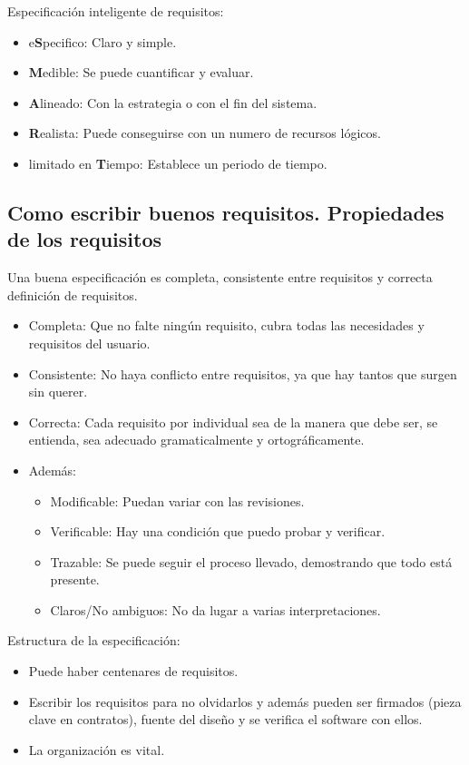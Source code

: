 \documentclass[12pt, twoside, openright]{report} %
\begin{document}
Especificación inteligente de requisitos:
\begin{itemize}
	\item e\textbf{S}pecifico: Claro y simple.
	\item \textbf{M}edible: Se puede cuantificar y evaluar.
	\item \textbf{A}lineado: Con la estrategia o con el fin del sistema.
	\item \textbf{R}ealista: Puede conseguirse con un numero de recursos lógicos.
	\item limitado en \textbf{T}iempo: Establece un periodo de tiempo.
\end{itemize}
\pagebreak
\subsection{Como escribir buenos requisitos. Propiedades de los requisitos}



Una buena especificación es completa, consistente entre requisitos y
correcta definición de requisitos.

\begin{itemize}
	\item Completa: Que no falte ningún requisito, cubra todas las
	      necesidades y requisitos del usuario.
	\item Consistente: No haya conflicto entre requisitos, ya que hay tantos
	      que surgen sin querer.
	\item Correcta: Cada requisito por individual sea de la manera que debe
	      ser, se entienda, sea adecuado gramaticalmente y ortográficamente.
	\item Además:

	      \begin{itemize}
		      \item Modificable: Puedan variar con las revisiones.
		      \item Verificable: Hay una condición que puedo probar y verificar.
		      \item Trazable: Se puede seguir el proceso llevado, demostrando que
		            todo está presente.
		      \item Claros/No ambiguos: No da lugar a varias interpretaciones.
	      \end{itemize}
\end{itemize}

Estructura de la especificación:

\begin{itemize}
	\item Puede haber centenares de requisitos.
	\item Escribir los requisitos para no olvidarlos y además pueden ser
	      firmados (pieza clave en contratos), fuente del diseño y se
	      verifica el software con ellos.
	\item La organización es vital.
\end{itemize}
\end{document}

